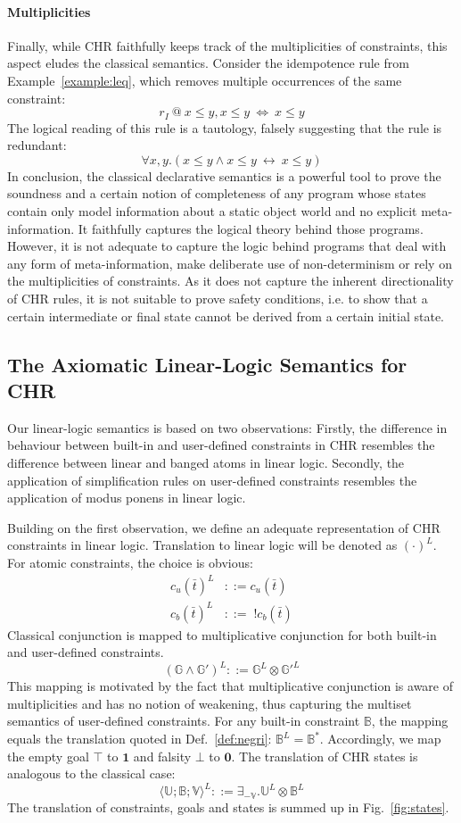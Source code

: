 \documentclass[acmtocl]{acmtrans2m}
\newcommand\state[1]{\langle #1 \rangle}
\newcommand{\B}{\ensuremath{\mathbb{B}}}
\newcommand{\U}{\ensuremath{\mathbb{U}}}
\newcommand{\V}{\ensuremath{\mathbb{V}}}
\newcommand{\G}{\ensuremath{\mathbb{G}}}
\newcommand{\cb}{\ensuremath{c_b(\bar t)}}
\newcommand{\cu}{\ensuremath{c_u(\bar t)}}
\newcommand{\bang}{\; !}
\newcommand{\lone}{\boldsymbol{1}}
\newcommand{\lzero}{\boldsymbol{0}}
\begin{document}
\paragraph*{Multiplicities} Finally, while CHR faithfully keeps track of the
multiplicities of constraints, this aspect eludes the classical semantics.
Consider the idempotence rule from Example~\ref{example:leq}, which removes
multiple occurrences of the same constraint:
\[
    r_I \ @ \ x\leq y,x\leq y \ \Leftrightarrow \ x\leq y
\]
The logical reading of this rule is a tautology, falsely suggesting that
the rule is redundant:
\[
	\forall x,y.(x\leq y
	\wedge x\leq y \ \leftrightarrow \ x\leq y)
\]
In conclusion, the classical declarative semantics is a powerful tool to prove
the soundness and a certain notion of completeness of any program whose states
contain only model information about a static object world and no explicit
meta-information. It faithfully captures the logical theory behind those
programs. However, it is not adequate to capture the logic behind programs that
deal with any form of meta-information, make deliberate use of non-determinism or
rely on the multiplicities of constraints. As it does not capture the inherent
directionality of CHR rules, it is not suitable to prove safety conditions, i.e.
to show that a certain intermediate or final state cannot be derived from a
certain initial state.

\subsection{The Axiomatic Linear-Logic Semantics for CHR}
  \label{sec:pt-sem}

Our linear-logic semantics is based on two observations: Firstly, the difference in behaviour
between built-in and user-defined constraints in CHR resembles the difference
between linear and banged atoms in linear logic. Secondly, the application of
simplification rules on user-defined constraints resembles the application
of modus ponens in linear logic.

Building on the first observation, we define an adequate representation of CHR
constraints in linear logic. Translation to linear logic will be denoted as
$(\cdot)^L$. For atomic constraints, the choice is obvious:
\begin{align*}
	\cu^L & ::= \cu \\
	\cb^L & ::= \bang\cb
\end{align*}
Classical conjunction is mapped to multiplicative conjunction for both built-in
and user-defined constraints.
\[
  (\G \wedge \G')^L ::= \G^L\otimes {\G'}^L
\]
This mapping is motivated by the fact that
multiplicative conjunction is aware of multiplicities and has no notion of
weakening, thus capturing the multiset semantics of user-defined constraints. For
any built-in constraint $\B$, the mapping equals the translation quoted in
Def.~\ref{def:negri}: $\B^L=\B^*$. Accordingly, we map the empty goal $\top$ to
$\lone$ and falsity $\bot$ to $\lzero$. The translation of CHR states is
analogous to the classical case:
\[
  \state{\U;\B;\V}^L ::= \exists_{-\V}.\U^L \otimes \B^L
\]
The translation of
constraints, goals and states is summed up in Fig.~\ref{fig:states}.
\end{document}
